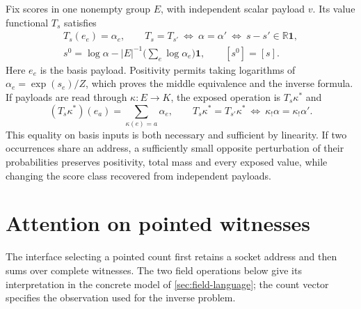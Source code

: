 \documentclass[11pt,a4paper]{article}
\theoremstyle{definition}
\theoremstyle{remark}\newaliascnt{remark}{theorem}
\newcommand{\R}{\mathbb R}
\numberwithin{equation}{section}
\begin{document}
Fix scores in one nonempty group \(E\), with independent scalar payload \(v\). Its value functional \(T_s\) satisfies
\[
 \begin{gathered}
 T_s(e_e)=\alpha_e,\qquad T_s=T_{s'}\ \Longleftrightarrow\ \alpha=\alpha'
      \ \Longleftrightarrow\ s-s'\in\R\mathbf1,\\
 s^0=\log\alpha-|E|^{-1}\Big(\sum_e\log\alpha_e\Big)\mathbf1,\qquad [s^0]=[s].
 \end{gathered}
\]
Here \(e_e\) is the basis payload. Positivity permits taking logarithms of \(\alpha_e=\exp(s_e)/Z\), which proves the middle equivalence and the inverse formula. If payloads are read through \(\kappa:E\to K\), the exposed operation is \(T_s\kappa^*\) and
\[
 (T_s\kappa^*)(e_a)=\sum_{\kappa(e)=a}\alpha_e,\qquad
 T_s\kappa^*=T_{s'}\kappa^*\ \Longleftrightarrow\
                   \kappa_!\alpha=\kappa_!\alpha'.
\]
This equality on basis inputs is both necessary and sufficient by linearity. If two occurrences share an address, a sufficiently small opposite perturbation of their probabilities preserves positivity, total mass and every exposed value, while changing the score class recovered from independent payloads.

\section{Attention on pointed witnesses}\label{sec:structured}

The interface selecting a pointed count first retains a socket address and then sums over complete witnesses. The two field operations below give its interpretation in the concrete model of \cref{sec:field-language}; the count vector specifies the observation used for the inverse problem.
\end{document}
